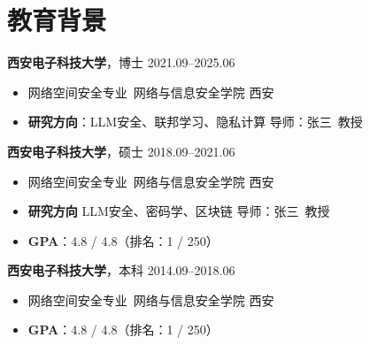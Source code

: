 \documentclass[11pt]{article}
\newlength{\iconwidth}
\begin{document}
    \begin{minipage}[t]{\textwidth}
        \section[教育背景]{\makebox[\iconwidth][c]{\color{primary_color}{\faGraduationCap}}\quad 教育背景}
        
        \vspace{0.5em}
        {\large \textbf{西安电子科技大学}}，博士 \hfill 2021.09--2025.06
        \begin{itemize}
            \item 网络空间安全专业\ 网络与信息安全学院 \hfill 西安
            \item \textbf{研究方向}：LLM安全、联邦学习、隐私计算 \hfill 导师：张三\ 教授
        \end{itemize}

        \vspace{0.5em}
        {\large \textbf{西安电子科技大学}}，硕士 \hfill 2018.09--2021.06
        \begin{itemize}
            \item 网络空间安全专业\ 网络与信息安全学院 \hfill 西安
            \item \textbf{研究方向} LLM安全、密码学、区块链 \hfill 导师：张三\ 教授
            \item \textbf{GPA}：4.8 / 4.8（排名：1 / 250）
        \end{itemize}

        \vspace{0.5em}
        {\large \textbf{西安电子科技大学}}，本科 \hfill 2014.09--2018.06
        \begin{itemize}
            \item 网络空间安全专业\ 网络与信息安全学院 \hfill 西安
            \item \textbf{GPA}：4.8 / 4.8（排名：1 / 250）
        \end{itemize}

        \vspace{1.2em}
    \end{minipage}
\end{document}
